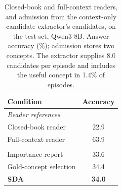 \begin{table}[tbp]
\centering
\caption{Closed-book and full-context readers, and admission from the context-only candidate extractor's candidates, on the test set,
Qwen3-8B. Answer accuracy (\%); admission stores two concepts. The extractor supplies 8.0 candidates per episode
and includes the useful concept in 1.4\% of episodes.}
\label{tab:readerproposal}
\small
\setlength{\tabcolsep}{8pt}
\begin{tabular}{lc}
\toprule
Condition & Accuracy \\
\midrule
\multicolumn{2}{l}{\emph{Reader references}} \\
Closed-book reader & 22.9 \\
Full-context reader & 63.9 \\
\addlinespace
\multicolumn{2}{l}{\emph{Admission from extracted candidates}} \\
Importance report & 33.6 \\
Gold-concept selection & 34.4 \\
\textbf{SDA} & \textbf{34.0} \\
\bottomrule
\end{tabular}
\end{table}
